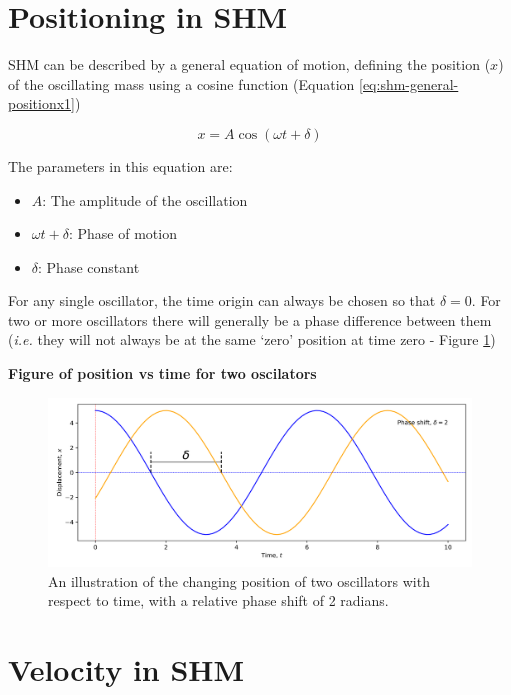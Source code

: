 \documentclass[
]{book}
\providecommand{\tightlist}{%
  \setlength{\itemsep}{0pt}\setlength{\parskip}{0pt}}
\begin{document}
\hypertarget{sec:shm-position}{%
\section{Positioning in SHM}\label{sec:shm-position}}

SHM can be described by a general equation of motion, defining the position (\(x\)) of the oscillating mass using a cosine function (Equation \eqref{eq:shm-general-positionx1})

\begin{equation}
x = A \cos (\omega t + \delta)
\label{eq:shm-general-positionx1}
\end{equation}

The parameters in this equation are:

\begin{itemize}
\tightlist
\item
  \(A\): The amplitude of the oscillation
\item
  \(\omega t + \delta\): Phase of motion
\item
  \(\delta\): Phase constant
\end{itemize}

For any single oscillator, the time origin can always be chosen so that \(\delta = 0\). For two or more oscillators there will generally be a phase difference between them (\emph{i.e.} they will not always be at the same `zero' position at time zero - Figure \ref{fig:ch1-shmpos-1})

\textbf{Figure of position vs time for two oscilators}

\begin{figure}

{\centering \includegraphics[width=0.7\linewidth]{visualisations/ch1-shmpos} 

}

\caption{An illustration of the changing position of two oscillators with respect to time, with a relative phase shift of 2 radians. }\label{fig:ch1-shmpos-1}
\end{figure}

\hypertarget{sec:shm-velocity}{%
\section{Velocity in SHM}\label{sec:shm-velocity}}
\end{document}
